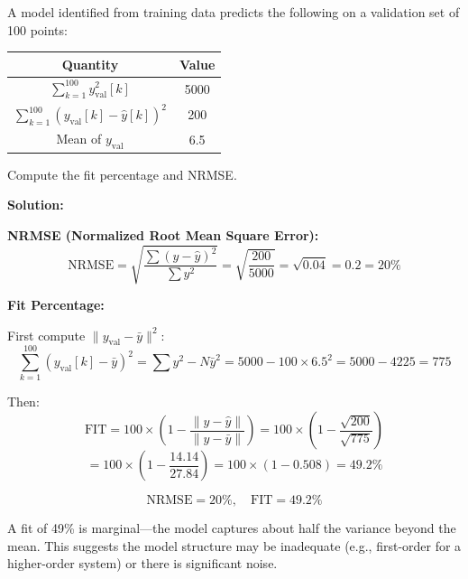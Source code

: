 \begin{example}
\label{ex:validation}
A model identified from training data predicts the following on a validation set of 100 points:

\begin{center}
\begin{tabular}{cc}
\toprule
Quantity & Value \\
\midrule
$\sum_{k=1}^{100} y^2_\text{val}[k]$ & 5000 \\
$\sum_{k=1}^{100} (y_\text{val}[k] - \hat{y}[k])^2$ & 200 \\
Mean of $y_\text{val}$ & 6.5 \\
\bottomrule
\end{tabular}
\end{center}

Compute the fit percentage and NRMSE.

\textbf{Solution:}

\textbf{NRMSE (Normalized Root Mean Square Error):}
\begin{equation*}
\text{NRMSE} = \sqrt{\frac{\sum(y - \hat{y})^2}{\sum y^2}} = \sqrt{\frac{200}{5000}} = \sqrt{0.04} = 0.2 = 20\%
\end{equation*}

\textbf{Fit Percentage:}

First compute $\|y_\text{val} - \bar{y}\|^2$:
\begin{equation*}
\sum_{k=1}^{100} (y_\text{val}[k] - \bar{y})^2 = \sum y^2 - N\bar{y}^2 = 5000 - 100 \times 6.5^2 = 5000 - 4225 = 775
\end{equation*}

Then:
\begin{equation*}
\text{FIT} = 100 \times \left(1 - \frac{\|y - \hat{y}\|}{\|y - \bar{y}\|}\right) = 100 \times \left(1 - \frac{\sqrt{200}}{\sqrt{775}}\right)
\end{equation*}
\begin{equation*}
= 100 \times \left(1 - \frac{14.14}{27.84}\right) = 100 \times (1 - 0.508) = 49.2\%
\end{equation*}

\begin{equation*}
\boxed{\text{NRMSE} = 20\%, \quad \text{FIT} = 49.2\%}
\end{equation*}

A fit of 49\% is marginal---the model captures about half the variance beyond the mean. This suggests the model structure may be inadequate (e.g., first-order for a higher-order system) or there is significant noise.
\end{example}

